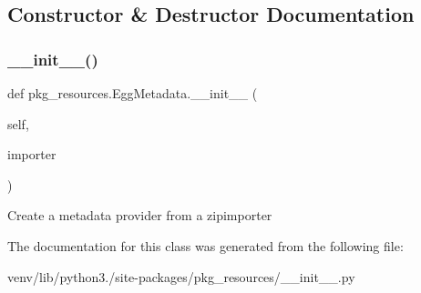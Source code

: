 \subsection{Constructor \& Destructor Documentation}
\mbox{\label{classpkg__resources_1_1_egg_metadata_a389d7931032f53576de67963be4ec790}} 
\subsubsection{\texorpdfstring{\+\_\+\+\_\+init\+\_\+\+\_\+()}{\_\_init\_\_()}}
{\footnotesize\ttfamily def pkg\+\_\+resources.\+Egg\+Metadata.\+\_\+\+\_\+init\+\_\+\+\_\+ (\begin{DoxyParamCaption}\item[{}]{self,  }\item[{}]{importer }\end{DoxyParamCaption})}

\begin{DoxyVerb}Create a metadata provider from a zipimporter\end{DoxyVerb}
 

The documentation for this class was generated from the following file\+:\begin{DoxyCompactItemize}
\item 
venv/lib/python3./site-\/packages/pkg\+\_\+resources/\+\_\+\+\_\+init\+\_\+\+\_\+.\+py\end{DoxyCompactItemize}
